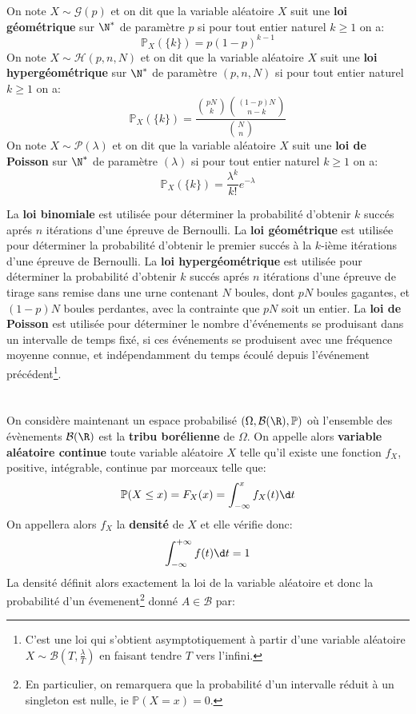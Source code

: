 On note \(X \sim \mathcal{G}(p)\) et on dit que la variable aléatoire \(X\) suit une \textbf{loi géométrique} sur \(\N^*\) de paramètre \(p\) si pour tout entier naturel \(k \geq 1\) on a:
\[
   \mathbb{P}_X(\{k\}) = p(1 - p)^{k - 1}
\]
On note \(X \sim \mathcal{H}(p, n, N)\) et on dit que la variable aléatoire \(X\) suit une \textbf{loi hypergéométrique} sur \(\N^*\) de paramètre \((p, n, N)\) si pour tout entier naturel \(k \geq 1\) on a:
\[
   \mathbb{P}_X(\{k\}) = \frac{\binom{pN}{k}\binom{(1-p)N}{n - k}}{\binom{N}{n}}
\]
On note \(X \sim \mathcal{P}(\lambda)\) et on dit que la variable aléatoire \(X\) suit une \textbf{loi de Poisson} sur \(\N^*\) de paramètre \((\lambda)\) si pour tout entier naturel \(k \geq 1\) on a:
\[
   \mathbb{P}_X(\{k\}) = \frac{\lambda^k}{k!}e^{-\lambda}
\]\<

La \textbf{loi binomiale} est utilisée pour déterminer la probabilité d'obtenir \(k\) succés aprés \(n\) itérations d'une épreuve de Bernoulli. \+
La \textbf{loi géométrique} est utilisée pour déterminer la probabilité d'obtenir le premier succés à la \(k\)-ième itérations d'une épreuve de Bernoulli.\+
La \textbf{loi hypergéométrique} est utilisée pour déterminer la probabilité d'obtenir \(k\) succés aprés \(n\) itérations d'une épreuve de tirage sans remise dans une urne contenant \(N\) boules, dont \(pN\) boules gagantes, et \((1-p)N\) boules perdantes, avec la contrainte que \(pN\) soit un entier.\+
La \textbf{loi de Poisson} est utilisée pour déterminer le nombre d'événements se produisant dans un intervalle de temps fixé, si ces événements se produisent avec une fréquence moyenne connue, et indépendamment du temps écoulé depuis l'événement précédent\footnote[2]{C'est une loi qui s'obtient asymptotiquement à partir d'une variable aléatoire \(X \sim \mathcal{B}(T, \frac{\lambda}{T})\) en faisant tendre \(T\) vers l'infini.}.\+

\chapter*{} %
On considère maintenant un espace probabilisé \((\Omega, \mathcal{B}(\R), \mathbb{P})\) où l'ensemble des évènements \(\mathcal{B}(\R)\) est la \textbf{tribu borélienne} de \(\Omega\).\+
On appelle alors \textbf{variable aléatoire continue} toute variable aléatoire \(X\) telle qu'il existe une fonction \(f_X\), positive, intégrable, continue par morceaux telle que:
\[
   \mathbb{P}(X \leq x) = F_X(x) = \int_{-\infty}^{x} f_X(t) \d t   
\]
On appellera alors \(f_X\) la \textbf{densité} de \(X\) et elle vérifie donc:
\[
   \int_{-\infty}^{+\infty} f(t) \d t = 1
\]
La densité définit alors exactement la  loi de la variable aléatoire et donc la probabilité d'un évemenent\footnote[1]{En particulier, on remarquera que la probabilité d'un intervalle réduit à un singleton est nulle, ie \(\mathbb{P}(X = x) = 0\).} donné \(A \in \mathscr{B}\) par:

